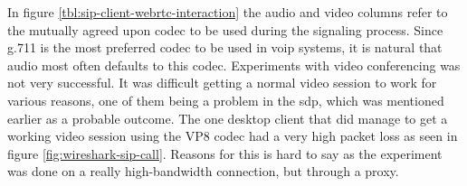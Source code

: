 \begin{table}[h]
\caption{SIP desktop client interaction with web client using proxy and RTCWeb}
\label{tbl:sip-client-webrtc-interaction}
\end{table}

In figure \ref{tbl:sip-client-webrtc-interaction} the audio and video columns refer to the mutually agreed upon codec to be used during the signaling process. Since g.711 is the most preferred codec to be used in \gls{voip} systems, it is natural that audio most often defaults to this codec. Experiments with video conferencing was not very successful. It was difficult getting a normal video session to work for various reasons, one of them being a problem in the \gls{sdp}, which was mentioned earlier as a probable outcome. The one desktop client that did manage to get a working video session using the VP8 codec had a very high packet loss as seen in figure \ref{fig:wireshark-sip-call}. Reasons for this is hard to say as the experiment was done on a really high-bandwidth connection, but through a proxy.

